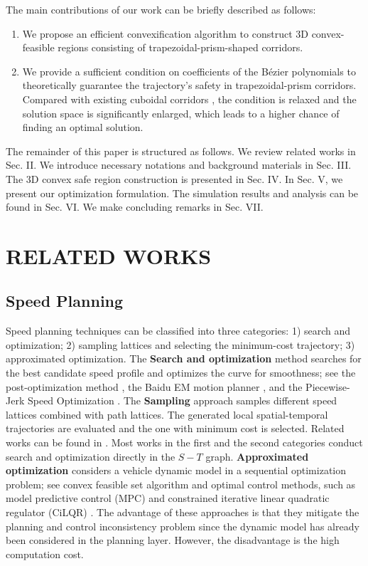 \documentclass[journal,a4paper,onecolumn,12pt]{IEEEtran}
\begin{document}
The main contributions of our work can be briefly described as follows:
\begin{enumerate}
    \item We propose an efficient convexification algorithm to construct 3D convex-feasible regions consisting of trapezoidal-prism-shaped corridors.
    \item We provide a sufficient condition on coefficients of the B\'{e}zier polynomials to theoretically guarantee the trajectory's safety in trapezoidal-prism corridors. Compared with existing cuboidal corridors \cite{ding_safe_2019}, the condition is relaxed and the solution space is significantly enlarged, which leads to a higher chance of finding an optimal solution.
\end{enumerate}

The remainder of this paper is structured as follows. We review related works in Sec. II. We introduce necessary notations and background materials in Sec. III. The 3D convex safe region construction is presented in Sec. IV. In Sec. V, we present our optimization formulation. The simulation results and analysis can be found in Sec. VI. We make concluding remarks in Sec. VII.

\section{RELATED WORKS}

\subsection{Speed Planning}
Speed planning techniques can be classified into three categories: 1) search and optimization; 2) sampling lattices and selecting the minimum-cost trajectory; 3) approximated optimization.
The \textbf{Search and optimization} method searches for the best candidate speed profile and optimizes the curve for smoothness; see the post-optimization method \cite{wenda_xu_real-time_2012}, the Baidu EM motion planner \cite{fan_baidu_2018}, and the Piecewise-Jerk Speed Optimization \cite{zhou_autonomous_2021}.
The \textbf{Sampling} approach samples different speed lattices combined with path lattices. The generated local spatial-temporal trajectories are evaluated and the one with minimum cost is selected. Related works can be found in \cite{gu_runtime-bounded_2016,wenda_xu_real-time_2012,li_real-time_2016}. Most works in the first and the second categories conduct search and optimization directly in the $S-T$ graph. \textbf{Approximated optimization} considers a vehicle dynamic model in a sequential optimization problem; see convex feasible set algorithm \cite{liu_speed_2017} and optimal control methods, such as model predictive control (MPC) \cite{qian_motion_2016} and constrained iterative linear quadratic regulator (CiLQR) \cite{pan_safe_2020}. The advantage of these approaches is that they mitigate the planning and control inconsistency problem since the dynamic model has already been considered in the planning layer. However, the disadvantage is the high computation cost.
\end{document}

